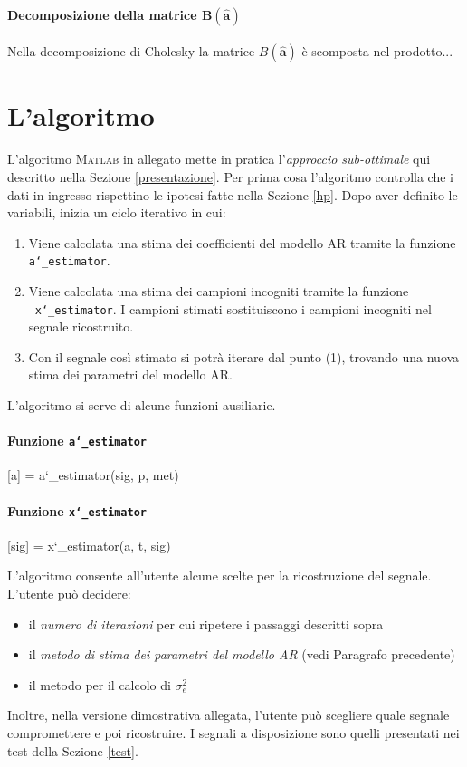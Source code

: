 \documentclass{article}
\begin{document}
\paragraph{Decomposizione della matrice $\mathbf{B(\hat{a})}$}
Nella decomposizione di Cholesky la matrice $B(\mathbf{\hat{a}})$ è scomposta nel prodotto...

\newpage
	\section{L'algoritmo} \label{algoritmo}
	L'algoritmo \textsc{Matlab} in allegato mette in pratica l'\emph{approccio sub-ottimale} 	qui descritto nella Sezione \ref{presentazione}. 
	Per prima cosa l'algoritmo controlla che i dati in ingresso rispettino le ipotesi fatte nella Sezione \ref{hp}.
	Dopo aver definito le variabili, inizia un ciclo iterativo in cui:
\begin{enumerate}	
\item Viene calcolata una stima dei coefficienti del modello AR tramite la funzione \texttt{a\char`_estimator}.

\item Viene calcolata una stima dei campioni incogniti tramite la funzione 			    	\\\ \texttt{x\char`_estimator}. I campioni stimati sostituiscono i campioni incogniti nel segnale ricostruito.

\item Con il segnale così stimato si potrà iterare dal punto (1), trovando una nuova stima dei parametri del modello AR.
\end{enumerate}
L'algoritmo si serve di alcune funzioni ausiliarie.
\paragraph{Funzione \texttt{a\char`_estimator}}
[a] = a\char`_estimator(sig, p, met)
\paragraph{Funzione \texttt{x\char`_estimator}}
[sig] = x\char`_estimator(a, t, sig)

\medskip
L'algoritmo consente all'utente alcune scelte per la ricostruzione del segnale.
L'utente può decidere:
\begin{itemize}
\item il \textit{numero di iterazioni} per cui ripetere i passaggi descritti sopra
\item il \textit{metodo di stima dei parametri del modello AR} (vedi Paragrafo precedente)
\item il metodo per il calcolo di $\sigma_{e}^{2}$
\end{itemize}
Inoltre, nella versione dimostrativa allegata, l'utente può scegliere quale segnale compromettere e poi ricostruire. I segnali a disposizione sono quelli presentati nei test della Sezione \ref{test}.
\end{document}
